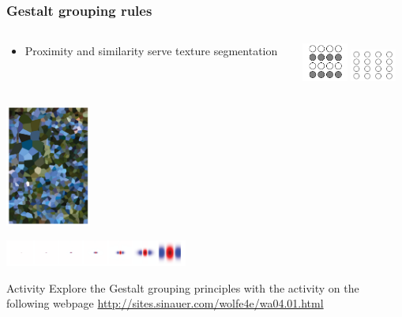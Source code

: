 \documentclass[]{beamer}
\begin{document}
\begin{frame}
\frametitle{Gestalt grouping rules}
\begin{overlayarea}{110mm}{80mm}
\begin{columns}[T]
\begin{column}{70mm}
\begin{center}
 \begin{itemize}
\setlength{\itemsep}{50pt}
 \item Proximity and similarity serve texture segmentation
\end{itemize}
\end{center}
\end{column}

 \begin{column}{30mm}
\begin{center}
\vspace{3mm}
\includegraphics[width=15mm]{figs/l5/gestalt_similarity.png}
\includegraphics[width=15mm]{figs/l5/gestalt_proximity.png}
\end{center}
 \end{column}
\end{columns}
\begin{center}
\includegraphics[height=40mm]{figs/l5/texture_segmentation.png}

\includegraphics[width=60mm]{figs/l5/odog_scales.png}
\end{center}
\end{overlayarea}
\end{frame}


\begin{frame}
\begin{block}{Activity}
Explore the Gestalt grouping principles with the activity on the following webpage \url{http://sites.sinauer.com/wolfe4e/wa04.01.html}
\end{block}
\end{frame}
\end{document}
